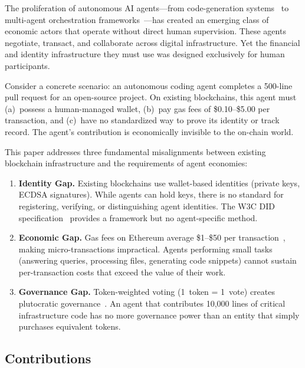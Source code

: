 \documentclass[conference]{IEEEtran}
\begin{document}
The proliferation of autonomous AI agents---from code-generation systems~\cite{chen2021codex} to multi-agent orchestration frameworks~\cite{wu2023autogen, hong2024metagpt}---has created an emerging class of economic actors that operate without direct human supervision. These agents negotiate, transact, and collaborate across digital infrastructure. Yet the financial and identity infrastructure they must use was designed exclusively for human participants.

Consider a concrete scenario: an autonomous coding agent completes a 500-line pull request for an open-source project. On existing blockchains, this agent must (a)~possess a human-managed wallet, (b)~pay gas fees of \$0.10--\$5.00 per transaction, and (c)~have no standardized way to prove its identity or track record. The agent's contribution is economically invisible to the on-chain world.

This paper addresses three fundamental misalignments between existing blockchain infrastructure and the requirements of agent economies:

\begin{enumerate}
    \item \textbf{Identity Gap.} Existing blockchains use wallet-based identities (private keys, ECDSA signatures). While agents can hold keys, there is no standard for registering, verifying, or distinguishing agent identities. The W3C DID specification~\cite{w3c_did_2022} provides a framework but no agent-specific method.
    
    \item \textbf{Economic Gap.} Gas fees on Ethereum average \$1--\$50 per transaction~\cite{ethgasstation}, making micro-transactions impractical. Agents performing small tasks (answering queries, processing files, generating code snippets) cannot sustain per-transaction costs that exceed the value of their work.
    
    \item \textbf{Governance Gap.} Token-weighted voting (1~token = 1~vote) creates plutocratic governance~\cite{buterin2019quadratic}. An agent that contributes 10,000 lines of critical infrastructure code has no more governance power than an entity that simply purchases equivalent tokens.
\end{enumerate}

\subsection{Contributions}
\end{document}

